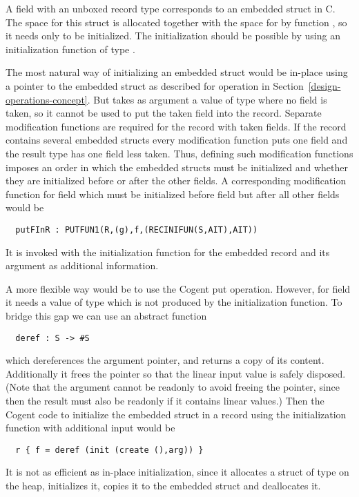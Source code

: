 A field  with an unboxed record type  corresponds to an embedded struct in C. The space for this struct is allocated together
with the space for  by function , so it needs only to be initialized. The initialization should be possible by using
an initialization function of type .

The most natural way of initializing an embedded struct would be in-place using a pointer to the embedded struct as described
for operation  in Section~\ref{design-operations-concept}. But  takes as argument a value of type 
where no field is taken, so it cannot be used to put the taken field  into the record. Separate modification functions
are required for the record with taken fields. If the record contains several embedded structs every modification function
puts one field and the result type has one field less taken. Thus, defining such modification functions imposes an order
in which the embedded structs must be initialized and whether they are initialized before or after the other fields. A corresponding
modification function for field  which must be initialized before field  but after all other fields would be
\begin{verbatim}
  putFInR : PUTFUN1(R,(g),f,(RECINIFUN(S,AIT),AIT))
\end{verbatim}
It is invoked with the initialization function for the embedded record and its argument 
as additional information.

A more flexible way would be to use the Cogent put operation. However, for field  it needs a value of type 
 which is not produced by the initialization function. To bridge this gap we can use an abstract function
\begin{verbatim}
  deref : S -> #S
\end{verbatim}
which dereferences the argument pointer, and returns a copy of its content. Additionally it frees the pointer so that the
linear input value is safely disposed. (Note that the argument cannot be readonly to avoid freeing the pointer, since then
the result must also be readonly if it contains linear values.) Then the Cogent code to initialize the embedded struct 
 in a record  using the initialization function  with additional input  would be
\begin{verbatim}
  r { f = deref (init (create (),arg)) }
\end{verbatim}
It is not as efficient as in-place initialization, since it allocates a struct of type  on the heap, initializes it,
copies it to the embedded struct  and deallocates it.

